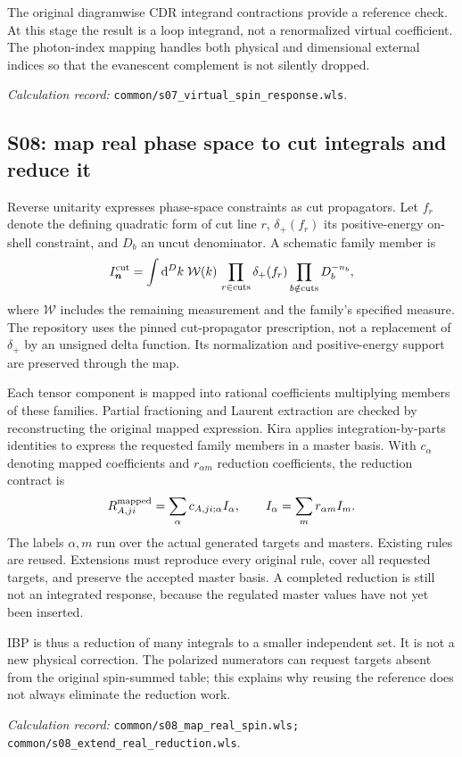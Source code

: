 \documentclass[11pt,a4paper]{article}
\newcommand{\dd}{\mathrm{d}}
\newcommand{\code}[1]{{\small\nolinkurl{#1}}}
\newcommand{\pathref}[1]{\par{\footnotesize\textit{Calculation record:} \code{#1}.}\par}
\begin{document}
The original diagramwise CDR integrand contractions provide a reference check. At this stage the result is a loop integrand, not a renormalized virtual coefficient. The photon-index mapping handles both physical and dimensional external indices so that the evanescent complement is not silently dropped.
\pathref{common/s07_virtual_spin_response.wls}

\subsection{S08: map real phase space to cut integrals and reduce it}
Reverse unitarity expresses phase-space constraints as cut propagators. Let $f_r$ denote the defining quadratic form of cut line $r$, $\delta_+(f_r)$ its positive-energy on-shell constraint, and $D_b$ an uncut denominator. A schematic family member is
\begin{equation}
 I_{\bm n}^{\rm cut}
 =\int\dd^D k\;\mathcal W(k)\,
   \prod_{r\in\mathrm{cuts}}\delta_+(f_r)
   \prod_{b\notin\mathrm{cuts}}D_b^{-n_b},
\end{equation}
where $\mathcal W$ includes the remaining measurement and the family's specified measure. The repository uses the pinned cut-propagator prescription, not a replacement of $\delta_+$ by an unsigned delta function. Its normalization and positive-energy support are preserved through the map.

Each tensor component is mapped into rational coefficients multiplying members of these families. Partial fractioning and Laurent extraction are checked by reconstructing the original mapped expression. Kira applies integration-by-parts identities to express the requested family members in a master basis. With $c_{\alpha}$ denoting mapped coefficients and $r_{\alpha m}$ reduction coefficients, the reduction contract is
\begin{equation}
 R_{A,ji}^{\rm mapped}=\sum_\alpha c_{A,ji;\alpha} I_\alpha,
 \qquad I_\alpha=\sum_m r_{\alpha m}I_m.
\end{equation}
The labels $\alpha,m$ run over the actual generated targets and masters. Existing rules are reused. Extensions must reproduce every original rule, cover all requested targets, and preserve the accepted master basis. A completed reduction is still not an integrated response, because the regulated master values have not yet been inserted.

IBP is thus a reduction of many integrals to a smaller independent set. It is not a new physical correction. The polarized numerators can request targets absent from the original spin-summed table; this explains why reusing the reference does not always eliminate the reduction work.
\pathref{common/s08_map_real_spin.wls; common/s08_extend_real_reduction.wls}
\end{document}
